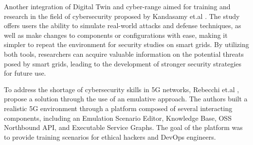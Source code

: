 Another integration of Digital Twin and cyber-range aimed for training and research in the field of cybersecurity proposed by Kandasamy et.al \cite{kandasamyElectricPowerDigital2022}. The study offers users the ability to simulate real-world attacks and defense techniques, as well as make changes to components or configurations with ease, making it simpler to repeat the environment for security studies on smart grids. By utilizing both tools, researchers can acquire valuable information on the potential threats posed by smart grids, leading to the development of stronger security strategies for future use. 

To address the shortage of cybersecurity skills in 5G networks, Rebecchi et.al \cite{rebecchiDigitalTwin5G2022}, propose a solution through the use of an emulative approach. The authors built a realistic 5G environment through a platform composed of several interacting components, including an Emulation Scenario Editor, Knowledge Base, OSS Northbound API, and Executable Service Graphs. The goal of the platform was to provide training scenarios for ethical hackers and DevOps engineers.  






